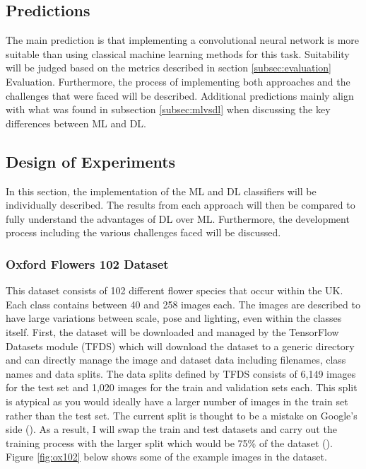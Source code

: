 \documentclass{article}
\begin{document}
\subsection{Predictions}

The main prediction is that implementing a convolutional neural network is more suitable than using classical machine 
learning methods for this task. Suitability will be judged based on the metrics described in section
\ref{subsec:evaluation} Evaluation. Furthermore, the process of implementing 
both approaches and the challenges that were faced will be described. Additional predictions mainly align with what was 
found in subsection \ref{subsec:mlvsdl} when discussing the key differences between ML and DL.

\subsection{Design of Experiments}

In this section, the implementation of the ML and DL classifiers will be individually described. The results from each
approach will then be compared to fully understand the advantages of DL over ML. Furthermore, the development process
including the various challenges faced will be discussed.

\subsubsection{Oxford Flowers 102 Dataset}

This dataset consists of 102 different flower species that occur within the UK. Each class contains between 40 and 258 
images each. The images are described to have large variations between scale, pose and lighting, even within the classes
itself. First, the dataset will be downloaded and managed by the TensorFlow Datasets module (TFDS) which will download 
the dataset to a generic directory and can directly manage the image and dataset data including filenames, class names 
and data splits. The data splits defined by TFDS consists of 6,149 images for the test set and 1,020 images for the 
train and validation sets each. This split is atypical as you would ideally have a larger number of images in the train 
set rather than the test set. The current split is thought to be a mistake on Google's side (\cite{githubissue}). As a 
result, I will swap the train and test datasets and carry out the training process with the larger split which would be 
75\% of the dataset (\cite{TFOX102}). Figure \ref{fig:ox102} below shows some of the example images in the dataset.
\end{document}
